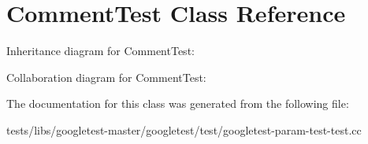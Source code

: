 \hypertarget{classCommentTest}{}\section{Comment\+Test Class Reference}
\label{classCommentTest}


Inheritance diagram for Comment\+Test\+:


Collaboration diagram for Comment\+Test\+:


The documentation for this class was generated from the following file\+:\begin{DoxyCompactItemize}
\item 
tests/libs/googletest-\/master/googletest/test/googletest-\/param-\/test-\/test.\+cc\end{DoxyCompactItemize}
